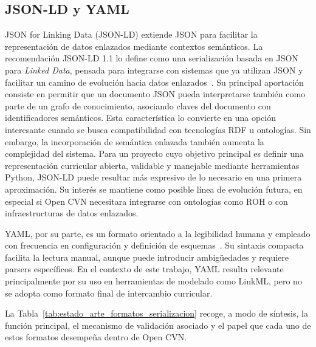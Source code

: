 \subsection{JSON-LD y YAML}
\label{subsec:estado_arte_jsonld_yaml}

JSON for Linking Data (JSON-LD) extiende JSON para facilitar la representación de
datos enlazados mediante contextos semánticos. La recomendación JSON-LD 1.1 lo
define como una serialización basada en JSON para \textit{Linked Data}, pensada
para integrarse con sistemas que ya utilizan JSON y facilitar un camino de
evolución hacia datos enlazados~\cite{w3c_json_ld_11}. Su principal aportación
consiste en permitir que un documento JSON pueda interpretarse también como parte
de un grafo de conocimiento, asociando claves del documento con identificadores
semánticos. Esta característica lo convierte en una opción interesante cuando se
busca compatibilidad con tecnologías RDF u ontologías. Sin embargo, la
incorporación de semántica enlazada también aumenta la complejidad
del sistema. Para un proyecto cuyo objetivo principal es definir una
representación curricular abierta, validable y manejable mediante herramientas
Python, JSON-LD puede resultar más expresivo de lo necesario en una primera
aproximación. Su interés se mantiene como posible línea de evolución futura, en
especial si Open CVN necesitara integrarse con ontologías como ROH o con
infraestructuras de datos enlazados.

YAML, por su parte, es un formato orientado a la legibilidad humana y empleado con
frecuencia en configuración y definición de esquemas~\cite{yaml_org}. Su sintaxis
compacta facilita la lectura manual, aunque puede introducir ambigüedades y
requiere parsers específicos. En el contexto de este trabajo, YAML resulta
relevante principalmente por su uso en herramientas de modelado como LinkML, pero
no se adopta como formato final de intercambio curricular.

La Tabla~\ref{tab:estado_arte_formatos_serializacion} recoge, a modo de síntesis,
la función principal, el mecanismo de validación asociado y el papel que cada uno
de estos formatos desempeña dentro de Open CVN.

